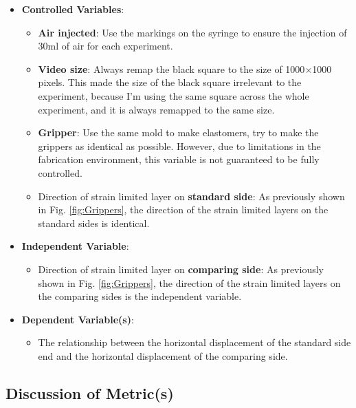 \documentclass[conference]{IEEEtran}
\begin{document}
\begin{itemize}
    \item \textbf{Controlled Variables}: %
    \begin{itemize}
        \item \textbf{Air injected}: Use the markings on the syringe to ensure the injection of 30ml of air for each experiment.
        \item \textbf{Video size}: Always remap the black square to the size of 1000$\times$1000 pixels. This made the size of the black square irrelevant to the experiment, because I'm using the same square across the whole experiment, and it is always remapped to the same size.
        \item \textbf{Gripper}: Use the same mold to make elastomers, try to make the grippers as identical as possible. However, due to limitations in the fabrication environment, this variable is not guaranteed to be fully controlled.
        \item Direction of strain limited layer on \textbf{standard side}:  As previously shown in Fig. \ref{fig:Grippers}, the direction of the strain limited layers on the standard sides is identical.
    \end{itemize}
    \item \textbf{Independent Variable}: 
        \begin{itemize}
            \item Direction of strain limited layer on \textbf{comparing side}: As previously shown in Fig. \ref{fig:Grippers}, the direction of the strain limited layers on the comparing sides is the independent variable. 
        \end{itemize}
    \item \textbf{Dependent Variable(s)}: 
         \begin{itemize}
             \item The relationship between the horizontal displacement of the standard side end and the horizontal displacement of the comparing side.
         \end{itemize}
\end{itemize}

\subsection{Discussion of Metric(s)}

\end{document}
